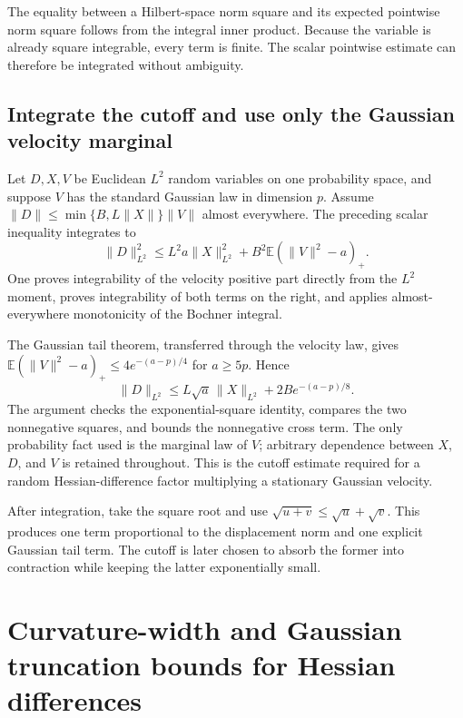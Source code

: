\documentclass[11pt,a4paper]{report}
\begin{document}
The equality between a Hilbert-space norm square and its expected pointwise norm square follows from the integral inner product. Because the variable is already square integrable, every term is finite. The scalar pointwise estimate can therefore be integrated without ambiguity.

\subsection{\texorpdfstring{Integrate the cutoff and use only the Gaussian velocity marginal}{Integrate the cutoff and use only the Gaussian velocity marginal}}
\label{report-step-KineticLangevin-GaussianTruncation-lean-3}


Let \(D,X,V\) be Euclidean \(L^{2}\) random variables on one probability space, and suppose \(V\) has the standard Gaussian law in dimension \(p\). Assume \(\|D\|\le\min\{B,L\|X\|\}\|V\|\) almost everywhere. The preceding scalar inequality integrates to \[\|D\|_{L^2}^2\le L^2a\|X\|_{L^2}^2+B^2\mathbb E(\|V\|^2-a)_+.\] One proves integrability of the velocity positive part directly from the \(L^{2}\) moment, proves integrability of both terms on the right, and applies almost-everywhere monotonicity of the Bochner integral.



The Gaussian tail theorem, transferred through the velocity law, gives \(\mathbb E(\|V\|^2-a)_+\le4e^{-(a-p)/4}\) for \(a\ge5p\). Hence \[\|D\|_{L^2}\le L\sqrt a\,\|X\|_{L^2}+2B e^{-(a-p)/8}.\] The argument checks the exponential-square identity, compares the two nonnegative squares, and bounds the nonnegative cross term. The only probability fact used is the marginal law of \(V\); arbitrary dependence between \(X\), \(D\), and \(V\) is retained throughout. This is the cutoff estimate required for a random Hessian-difference factor multiplying a stationary Gaussian velocity.



After integration, take the square root and use \(\sqrt{u+v}\le\sqrt u+\sqrt v\). This produces one term proportional to the displacement norm and one explicit Gaussian tail term. The cutoff is later chosen to absorb the former into contraction while keeping the latter exponentially small.

\section{\texorpdfstring{Curvature-width and Gaussian truncation bounds for Hessian differences}{Curvature-width and Gaussian truncation bounds for Hessian differences}}
\label{proof-module-KineticLangevin-HessianDifference-lean}
\end{document}
